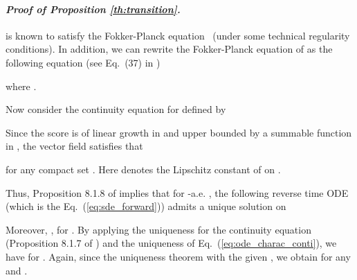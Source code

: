\documentclass{article} \usepackage{iclr2024_coNFErence,times}
\def\eqref#1{equation~\ref{#1}}
\newenvironment{myproof}[2]{\paragraph{\textit{Proof of {#1} {#2}. }}}{\hfill}
\def\eqref#1{(\ref{#1})}
\def\eqref#1{(\ref{#1})}
\theoremstyle{definition}
\theoremstyle{remark}
\begin{document}
\begin{myproof}{Proposition}{\ref{th:transition}}
     is known to satisfy the Fokker-Planck equation~\citep{oksendal2003stochastic} (under some technical regularity conditions). In addition, we can rewrite the Fokker-Planck equation of  as the following equation (see Eq.~(37) in \citep{song2020score})
    
    where . 

    Now consider the continuity equation for  defined by  
    
    Since the score  is of linear growth in  and upper bounded by a summable function in , the vector field  satisfies that 
        
    for any compact set . Here  denotes the Lipschitz constant of  on .

    Thus, Proposition 8.1.8 of \citep{ambrosio2005gradient} implies that for -a.e. , the following reverse time ODE (which is the Eq.~\eqref{eq:sde_forward}) admits a unique solution on 
    
    Moreover, , for . By applying the uniqueness for the continuity equation (Proposition 8.1.7 of \citep{ambrosio2005gradient}) and the uniqueness of Eq.~\eqref{eq:ode_charac_conti}, we have  for . Again, since the uniqueness theorem with the given , we obtain  for any  and .
    
\end{myproof}
\end{document}

